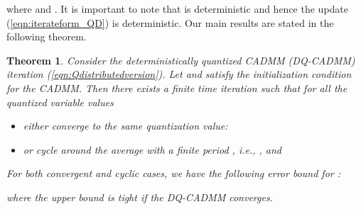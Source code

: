 \documentclass[journal]{IEEEtran}
\newtheorem{theorem}{Theorem}
\begin{document}
where  and . It is important to note that  is deterministic and hence the update (\ref{eqn:iterateform_QD}) is deterministic. Our main results are stated in the following theorem.
\begin{theorem}
\label{thm:mainresults}
Consider the deterministically quantized CADMM (DQ-CADMM) iteration (\ref{eqn:Qdistributedversion}). Let  and  satisfy the initialization condition for the CADMM. Then there exists a finite time iteration  such that for  all the quantized variable values
\begin{itemize}
\item either converge to the same quantization value:



\item or cycle around the average  with a finite period , i.e., , and 

\end{itemize}

For both convergent and cyclic cases, we have the following error bound for :

where the upper bound is tight if the DQ-CADMM converges.



\end{theorem}
\end{document}
